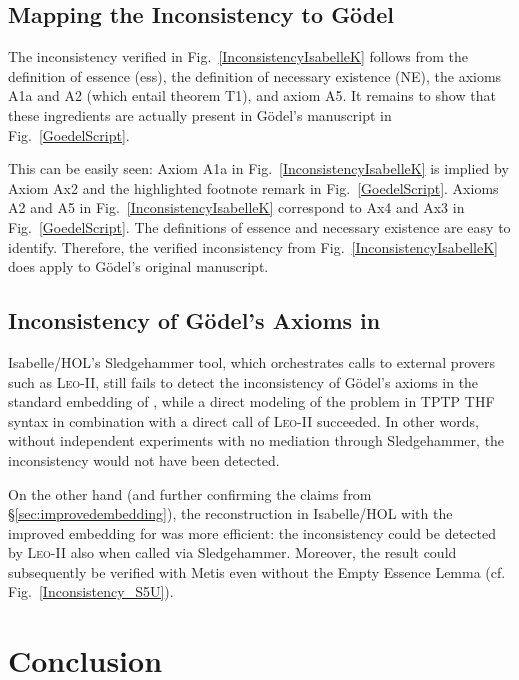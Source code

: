 \documentclass{article}
\begin{document}
\subsection{Mapping the Inconsistency to G\"odel}

The inconsistency verified in Fig.~\ref{InconsistencyIsabelleK} follows from the definition of
essence (ess), the definition of necessary existence (NE), the
axioms A1a and A2 (which entail theorem T1), and axiom A5. It remains to show that
these ingredients are actually present in G\"odel's manuscript in
Fig.~\ref{GoedelScript}. 


This can be easily seen: Axiom A1a in
Fig.~\ref{InconsistencyIsabelleK} is implied by Axiom Ax2 and the
highlighted footnote remark in Fig.~\ref{GoedelScript}. Axioms A2 and
A5 in Fig.~\ref{InconsistencyIsabelleK} correspond to Ax4 and Ax3 in
Fig.~\ref{GoedelScript}. The definitions of essence and necessary
existence are easy to identify. Therefore, the verified
inconsistency from Fig.~\ref{InconsistencyIsabelleK} does apply to 
G\"odel's original manuscript.


\subsection{Inconsistency of G\"odel's Axioms in \SFiveU}

Isabelle/HOL's Sledgehammer tool, which orchestrates calls to
external provers such as \textsc{Leo-II}, still
fails to detect the inconsistency of G\"odel's axioms in the standard
embedding of \SFive, while a direct modeling of the problem in TPTP THF syntax
in combination with a direct call of \textsc{Leo-II} succeeded. In
other words, without independent experiments with no mediation through Sledgehammer, the
inconsistency would not have been detected.


On the other hand (and further confirming the claims from \S\ref{sec:improvedembedding}), 
the reconstruction in Isabelle/HOL with the improved embedding for \SFiveU was more efficient: 
the inconsistency could be detected
by \textsc{Leo-II} also when called via
Sledgehammer. Moreover, the result could subsequently be verified with
Metis even without the Empty Essence Lemma (cf. Fig.~\ref{Inconsistency_S5U}). 



\section{Conclusion}\label{sec:conclusion}
\end{document}
